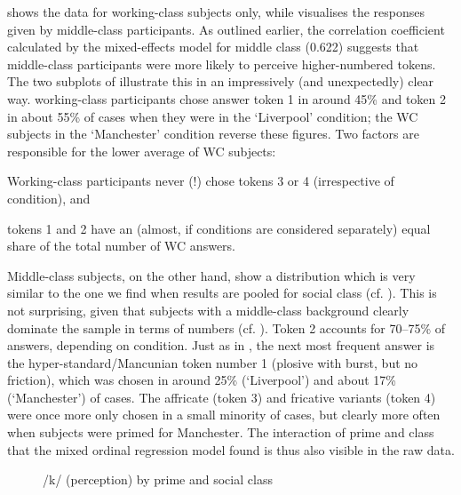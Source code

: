  shows the data for working-class subjects only, while  visualises the responses given by middle-class participants.
As outlined earlier, the correlation coefficient calculated by the mixed-effects model for middle class (0.622) suggests that middle-class participants were more likely to perceive higher-numbered tokens.
The two subplots of  illustrate this in an impressively (and unexpectedly) clear way.
working-class participants chose answer token 1 in around 45\% and token 2 in about 55\% of cases when they were in the `Liverpool' condition; the WC subjects in the `Manchester' condition reverse these figures.
Two factors are responsible for the lower average of WC subjects:
\begin{inparaenum}[(a)]
	\item Working-class participants never (!) chose tokens 3 or 4 (irrespective of  condition), and
	\item tokens 1 and 2 have an (almost, if conditions are considered separately) equal share of the total number of WC answers.
\end{inparaenum} 

Middle-class subjects, on the other hand, show a distribution which is very similar to the one we find when results are pooled for social class (cf. ).
This is not surprising, given that subjects with a middle-class background clearly dominate the sample in terms of numbers (cf. ).
Token 2 accounts for 70--75\% of answers, depending on  condition.
Just as in , the next most frequent answer is the hyper-standard/Mancunian token number 1 (plosive with burst, but no friction), which was chosen in around 25\% (`Liverpool') and about 17\% (`Manchester') of cases.
The affricate (token 3) and fricative variants (token 4) were once more only chosen in a small minority of cases, but clearly more often when subjects were primed for Manchester.
The interaction of prime and class that the mixed ordinal regression model found is thus also visible in the raw data.

\begin{figure}
	
		\resizebox{.49\linewidth}{!}{} 
	\caption{/k/ (perception) by prime and social class}
	\label{fig.scatter.k.ext.classprime}
\end{figure}

